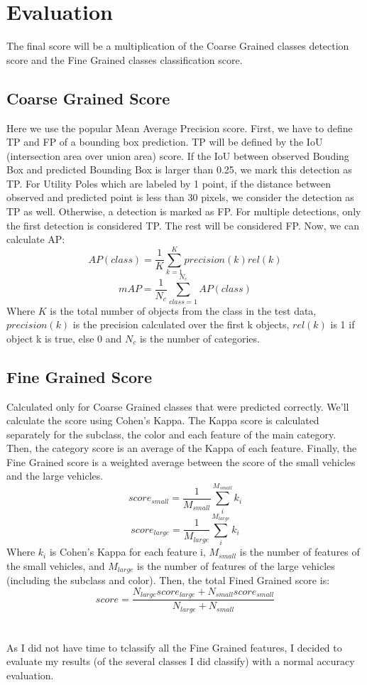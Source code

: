 \documentclass[]{article}
\begin{document}
\section{Evaluation}
The final score will be a multiplication of the Coarse Grained classes detection score and the Fine Grained classes classification score.

\subsection{Coarse Grained Score}
Here we use the popular Mean Average Precision score. First, we have to define TP and FP of a bounding box prediction. TP will be defined by the IoU (intersection area over union area) score. If the IoU between observed Bouding Box and predicted Bounding Box is larger than 0.25, we mark this detection as TP. For Utility Poles which are labeled by 1 point, if the distance between observed and predicted point is less than 30 pixels, we consider the detection as TP as well. Otherwise, a detection is marked as FP. For multiple detections, only the first detection is considered TP. The rest will be considered FP. Now, we can calculate AP:\\
$$AP(class)=\frac{1}{K}\sum_{k=1}^{K}precision(k)rel(k)$$
$$mAP=\frac{1}{N_c}\sum_{class=1}^{N_c}AP(class)$$
Where $K$ is the total number of objects from the class in the test data, $precision(k)$ is the precision calculated over the first k objects, $rel(k)$ is 1 if object k is true, else 0 and $N_c$ is the number of categories.

\subsection{Fine Grained Score}
Calculated only for Coarse Grained classes that were predicted correctly. We'll calculate the score using Cohen's Kappa. The Kappa score is calculated separately for the subclass, the color and each feature of the main category. Then, the category score is an average of the Kappa of each feature. Finally, the Fine Grained score is a weighted average between the score of the small vehicles and the large vehicles.
$$score_{small}=\frac{1}{M_{small}}\sum_{i}^{M_{small}}k_i$$
$$score_{large}=\frac{1}{M_{large}}\sum_{i}^{M_{large}}k_i$$
Where $k_i$ is Cohen's Kappa for each feature i, $M_{small}$ is the number of features of the small vehicles, and $M_{large}$ is the number of features of the large vehicles (including the subclass and color).
Then, the total Fined Grained score is:
$$score=\frac{N_{large}score_{large}+N_{small}score_{small}}{N_{large}+N_{small}}$$
\\\\
As I did not have time to tclassify all the Fine Grained features, I decided to evaluate my results (of the several classes I did classify) with a normal accuracy evaluation.
\end{document}

